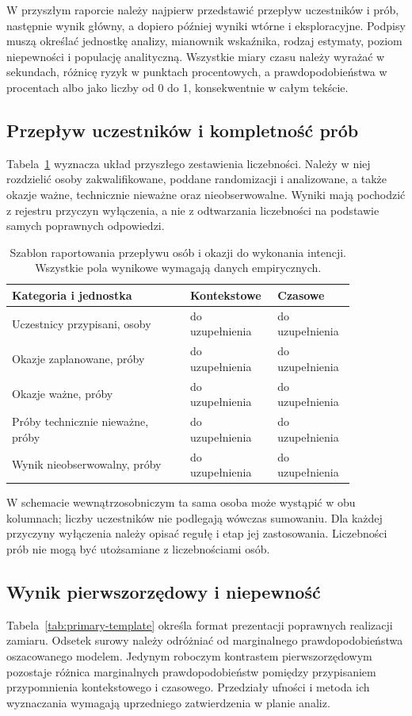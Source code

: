 \documentclass[11pt,a4paper]{article}
\begin{document}
W przyszłym raporcie należy najpierw przedstawić przepływ uczestników i prób, następnie wynik główny, a dopiero później wyniki wtórne i eksploracyjne. Podpisy muszą określać jednostkę analizy, mianownik wskaźnika, rodzaj estymaty, poziom niepewności i populację analityczną. Wszystkie miary czasu należy wyrażać w sekundach, różnicę ryzyk w punktach procentowych, a prawdopodobieństwa w procentach albo jako liczby od 0 do 1, konsekwentnie w całym tekście.

\subsection{Przepływ uczestników i kompletność prób}
Tabela~\ref{tab:flow-template} wyznacza układ przyszłego zestawienia liczebności. Należy w niej rozdzielić osoby zakwalifikowane, poddane randomizacji i analizowane, a także okazje ważne, technicznie nieważne oraz nieobserwowalne. Wyniki mają pochodzić z rejestru przyczyn wyłączenia, a nie z odtwarzania liczebności na podstawie samych poprawnych odpowiedzi.

\begin{table}[htbp]
\centering
\caption{Szablon raportowania przepływu osób i okazji do wykonania intencji. Wszystkie pola wynikowe wymagają danych empirycznych.}
\label{tab:flow-template}
\small
\begin{tabular}{p{0.48\linewidth}p{0.19\linewidth}p{0.19\linewidth}}
\hline
Kategoria i jednostka & Kontekstowe & Czasowe \\
\hline
Uczestnicy przypisani, osoby & do uzupełnienia & do uzupełnienia \\
Okazje zaplanowane, próby & do uzupełnienia & do uzupełnienia \\
Okazje ważne, próby & do uzupełnienia & do uzupełnienia \\
Próby technicznie nieważne, próby & do uzupełnienia & do uzupełnienia \\
Wynik nieobserwowalny, próby & do uzupełnienia & do uzupełnienia \\
\hline
\end{tabular}
\end{table}

W schemacie wewnątrzosobniczym ta sama osoba może wystąpić w obu kolumnach; liczby uczestników nie podlegają wówczas sumowaniu. Dla każdej przyczyny wyłączenia należy opisać regułę i etap jej zastosowania. Liczebności prób nie mogą być utożsamiane z liczebnościami osób.

\subsection{Wynik pierwszorzędowy i niepewność}
Tabela~\ref{tab:primary-template} określa format prezentacji poprawnych realizacji zamiaru. Odsetek surowy należy odróżniać od marginalnego prawdopodobieństwa oszacowanego modelem. Jedynym roboczym kontrastem pierwszorzędowym pozostaje różnica marginalnych prawdopodobieństw pomiędzy przypisaniem przypomnienia kontekstowego i czasowego. Przedziały ufności i metoda ich wyznaczania wymagają uprzedniego zatwierdzenia w planie analiz.
\end{document}
